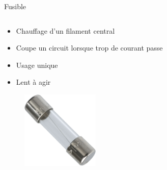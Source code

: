 \begin{frame}{Fusible}
    \begin{columns}
        \begin{column}{0.5\textwidth}
            \begin{itemize}
                \item Chauffage d'un filament central
                \item Coupe un circuit lorsque trop de courant passe
                \bigskip
                \item Usage unique
                \item Lent à agir
            \end{itemize}
            \vspace{12pt}
            \begin{figure}
                \centering
                \includegraphics[width=0.33\textwidth]{pictures/fuse.png}
            \end{figure}
        \end{column}


\end{columns}
\end{frame}
